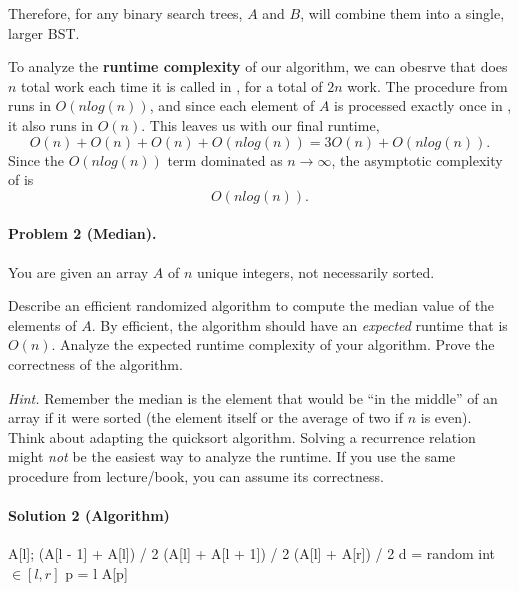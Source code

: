 \documentclass[11pt]{article}
\begin{document}
Therefore, for any binary search trees, $A$ and $B$,  will
combine them into a single, larger BST.

To analyze the \textbf{runtime complexity} of our algorithm, we can obesrve
that  does $n$ total work each time it is called in 
, for a total of $2n$ work. The  procedure from
 runs in $O(nlog(n))$, and since each element of $A$ is
processed exactly once in , it also runs in $O(n)$. This 
leaves us with our final runtime,
\[
O(n) + O(n) + O(n) + O(nlog(n)) = 3O(n) + O(nlog(n)).
\]
Since the $O(nlog(n))$ term dominated as $n \rightarrow \infty$, the
asymptotic complexity of  is 
\[
    \boxed{O(nlog(n))}.
\]


\newpage
\paragraph{Problem 2 (Median).} You are given an array $A$ of $n$ unique integers, not necessarily sorted. 

Describe an efficient randomized algorithm to compute the median value of the elements of $A$. By efficient, the algorithm should have an \textit{expected} runtime that is $O(n)$. Analyze the expected runtime complexity of your algorithm. Prove the correctness of the algorithm.

\textit{Hint.} Remember the median is the element that would be ``in the middle'' of an array if it were sorted (the element itself or the average of two if $n$ is even). Think about adapting the quicksort algorithm. Solving a recurrence relation might \textit{not} be the easiest way to analyze the runtime. If you use the same  procedure from lecture/book, you can assume its correctness.

\paragraph{Solution 2 (Algorithm)}

\begin{algorithmic}[1]
                \State \Return A[l];
                \State \Return (A[l - 1] + A[l]) / 2
            \Else 
                \State \Return (A[l] + A[l + 1]) / 2
            \EndIf
        \EndIf
            \State \Return (A[l] + A[r]) / 2
        \EndIf
        \State d = random int $\in [l, r]$
        \State {}
        \State p = l
        \State {} 
            \State \Return {}
            \State \Return {}
        \Else
            \State \Return A[p]
        \EndIf
    \EndProcedure
\end{algorithmic}
\end{document}
